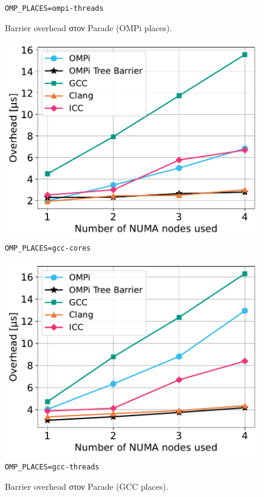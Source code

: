 \begin{figure}
\begin{minipage}{0.5\textwidth}
        \texttt{OMP\_PLACES=ompi-threads}
    \end{minipage}
    \caption{Barrier overhead στον Parade (OMPi places).}
    \label{fig:bo-parade-ompi-places}
\end{figure}

\begin{figure}
    \centering
    \begin{minipage}{0.5\textwidth}
        \centering
        \includegraphics[width=1\textwidth]{Figures/epcc_20210823_175412/gcc-places_cores_close.pdf}
		\texttt{OMP\_PLACES=gcc-cores}
    \end{minipage}\hfill
    \begin{minipage}{0.5\textwidth}
        \centering
        \includegraphics[width=1\textwidth]{Figures/epcc_20210823_175412/gcc-places_threads_close.pdf}
        \texttt{OMP\_PLACES=gcc-threads}
    \end{minipage}
    \caption{Barrier overhead στον Parade (GCC places).}
    \label{fig:bo-parade-gcc-places}
\end{figure}

